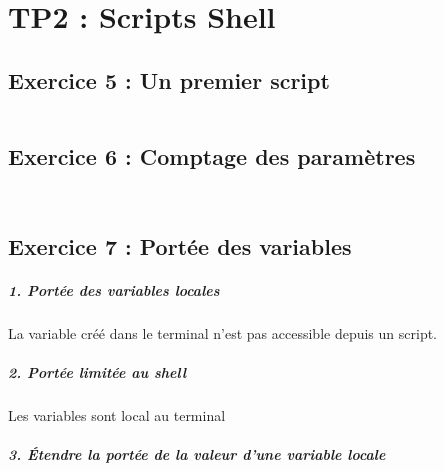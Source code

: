 \chapter{TP2 : Scripts Shell}

\section{Exercice 5 : Un premier script}
\inputminted{bash}{../sources/shell/TP2/ex5.sh}

\section{Exercice 6 : Comptage des paramètres}
\inputminted{bash}{../sources/shell/TP2/ex6-parametres.sh}
\inputminted{bash}{../sources/shell/TP2/ex6-parametres2.sh}

\section{Exercice 7 : Portée des variables}

\paragraph{1. Portée des variables locales}
La variable créé dans le terminal n'est pas accessible depuis un script.

\paragraph{2. Portée limitée au shell}
Les variables sont local au terminal

\paragraph{3. Étendre la portée de la valeur d’une variable locale}
